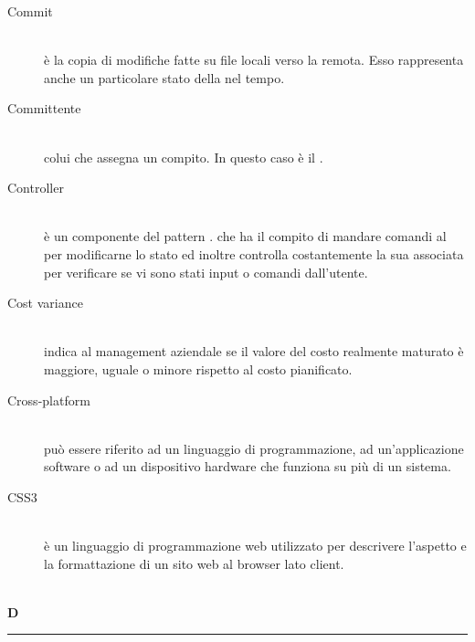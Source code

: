 \documentclass[12pt,a4paper]{article}
\begin{document}
\begin{description}
\item[Commit] 
\hfill\\ è la copia di modifiche fatte su file locali verso la  remota. Esso rappresenta anche un particolare stato della  nel tempo.

\item[Committente] 
\hfill\\ colui che assegna un compito. In questo caso è il \Vardanega{}.

\item[Controller] 
\hfill\\ è un componente del pattern . che ha il compito di mandare comandi al  per modificarne lo stato ed inoltre controlla costantemente la sua  associata per verificare se vi sono stati input o comandi dall'utente.

\item[Cost variance] 
\hfill\\ indica al management aziendale se il valore del costo realmente maturato è maggiore, uguale o minore rispetto al costo pianificato.

\item[Cross-platform] 
\hfill\\ può essere riferito ad un linguaggio di programmazione, ad un'applicazione software o ad un dispositivo hardware che funziona su più di un sistema.

\item[CSS3] 
\hfill\\ è un linguaggio di programmazione web utilizzato per descrivere l'aspetto e la formattazione di un sito web al browser lato client.
\end{description}

\newpage

\begin{center}
\hfill\\
	\LARGE \textbf{D}
\hfill\\
\rule[15pt]{30pt}{0.5pt}
\end{center}
\end{document}
